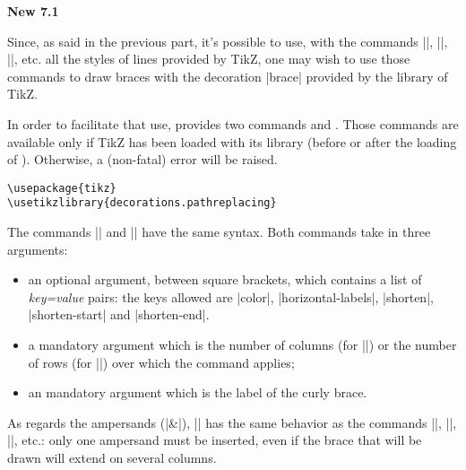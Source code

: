 \documentclass[dvipsnames]{article}%
\begin{document}
\colorbox{yellow!50}{\textbf{New 7.1}}

\label{Hbrace}


\smallskip
Since, as said in the previous part, it's possible to use, with the commands
|\Cdots|, |\Ldots|, |\Vdots|, etc. all the styles of lines provided by TikZ, one
may wish to use those commands to draw braces with the decoration |brace|
provided by the library  of TikZ.

\smallskip
In order to facilitate that use,  provides two commands
 and . Those commands are
available only if TikZ has been loaded with its library
 (before or after the loading of
). Otherwise, a (non-fatal) error will be raised.
\begin{Verbatim}
\usepackage{tikz}
\usetikzlibrary{decorations.pathreplacing}
\end{Verbatim}

\medskip
The commands |\Hbrace| and |\Vbrace| have the same syntax. Both commands take in
three arguments:
\begin{itemize}
\item an optional argument, between square brackets, which contains a list of
\textsl{key=value} pairs: the keys allowed are |color|, |horizontal-labels|,
|shorten|, |shorten-start| and |shorten-end|.

\item a mandatory argument which is the number of columns (for |\Hbrace|) or the
number of rows (for |\Vbrace|) over which the command applies;

\item an mandatory argument which is the label of the curly brace.
\end{itemize}

As regards the ampersands (|&|), |\Hbrace| has the same behavior as the commands
|\multicolumn|, |\hdotsfor|, |\Hdotsfor|, etc.: only one ampersand must be
inserted, even if the brace that will be drawn will extend on several columns.
\end{document}
